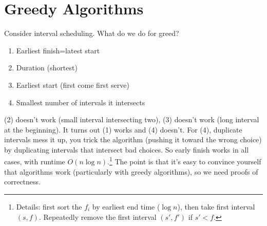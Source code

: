 \section{Greedy Algorithms} 
Consider interval scheduling. What do we do for greed?
\begin{enumerate}[label=(\arabic*)]
\setlength\itemsep{-.2em}
    \item Earliest finish=latest start
    \item Duration (shortest)
    \item Earliest start (first come first serve)
    \item Smallest number of intervals it intersects
\end{enumerate}
(2) doesn't work (small interval intersecting two), (3) doesn't work (long interval at the beginning). It turns out (1) works and (4) doesn't. For (4), duplicate intervals mess it up, you trick the algorithm (pushing it toward the wrong choice) by duplicating intervals that intersect bad choices. So early finish works in all cases, with runtime $O(n \log n)$.\footnote{Details: first sort the $f_i $ by earliest end time ($\log n$), then take first interval $(s,f)$. Repeatedly remove the first interval $(s',f')$ if $s'<f$.} The point is that it's easy to convince yourself that algorithms work (particularly with greedy algorithms), so we need proofs of correctness.

